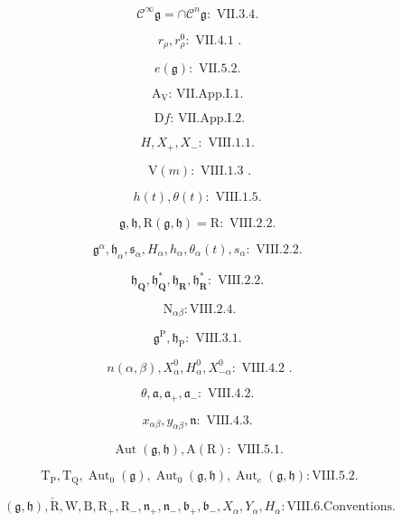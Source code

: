 \[
\mathscr {C} ^ {\infty} \mathfrak {g} = \cap \mathscr {C} ^ {n} \mathfrak {g}: \text { VII.3.4. }
\]

\[
r _ {\rho}, r _ {\rho} ^ {0}: \text { VII.4.1 }.
\]

\[
e (\mathfrak {g}): \text {   VII.5.2.   }
\]

\[
\mathrm{A} _ {\mathrm{V}} \text {: VII.App.I.1. }
\]

\[
\mathrm{D} f \text {: VII.App.I.2.}
\]

\[
H, X _ {+}, X _ {-}: \text {   VIII.1.1.   }
\]

\[
\mathrm{V} (m): \text { VIII.1.3 }.
\]

\[
h (t), \theta (t): \text {   VIII.1.5.   }
\]

\[
\mathfrak {g}, \mathfrak {h}, \mathrm{R} (\mathfrak {g}, \mathfrak {h}) = \mathrm{R}: \text {   VIII.2.2.   }
\]

\[
\mathfrak {g} ^ {\alpha}, \mathfrak {h} _ {\alpha}, \mathfrak {s} _ {\alpha}, H _ {\alpha}, h _ {\alpha}, \theta_ {\alpha} (t), s _ {\alpha}: \text {   VIII.2.2.   }
\]

\[
\mathfrak {h} _ {\mathbf {Q}}, \mathfrak {h} _ {\mathbf {Q}} ^ {*}, \mathfrak {h} _ {\mathbf {R}}, \mathfrak {h} _ {\mathbf {R}} ^ {*}: \text {   VIII.2.2.   }
\]

\[
\mathrm{N} _ {\alpha \beta}: \mathrm{VIII.2.4}.
\]

\[
\mathfrak {g} ^ {\mathrm{P}}, \mathfrak {h} _ {\mathrm{P}}: \text {   VIII.3.1.   }
\]

\[
n (\alpha , \beta), X _ {\alpha} ^ {0}, H _ {\alpha} ^ {0}, X _ {- \alpha} ^ {0}: \text { VIII.4.2 }.
\]

\[
\theta , \mathfrak {a}, \mathfrak {a} _ {+}, \mathfrak {a} _ {-}: \text {   VIII.4.2.   }
\]

\[
x _ {\alpha \beta}, y _ {\alpha \beta}, \mathfrak {n}: \text {   VIII.4.3.   }
\]

\[
\operatorname{Aut} (\mathfrak {g}, \mathfrak {h}), \mathrm{A} (\mathrm{R}): \text {   VIII.5.1.   }
\]

\[
\mathrm{T} _ {\mathrm{P}}, \mathrm{T} _ {\mathrm{Q}}, \operatorname{Aut} _ {0} (\mathfrak {g}), \operatorname{Aut} _ {0} (\mathfrak {g}, \mathfrak {h}), \operatorname{Aut} _ {e} (\mathfrak {g}, \mathfrak {h}): \text {VIII.5.2}.
\]

\[
(\mathfrak {g}, \mathfrak {h}), \check {\mathrm{R}}, \mathrm{W}, \mathrm{B}, \mathrm{R} _ {+}, \mathrm{R} _ {-}, \mathfrak {n} _ {+}, \mathfrak {n} _ {-}, \mathfrak {b} _ {+}, \mathfrak {b} _ {-}, X _ {\alpha}, Y _ {\alpha}, H _ {\alpha}: \text {VIII.6.Conventions.}
\]

